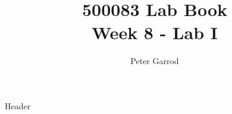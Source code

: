 \documentclass{article}
\title{%
    500083 Lab Book \\
    \large Week 8 - Lab I
    }
\author{Peter Garrod}
\begin{document}
    \maketitle
    \tableofcontents
    \newpage

    {Header}
\end{document}
